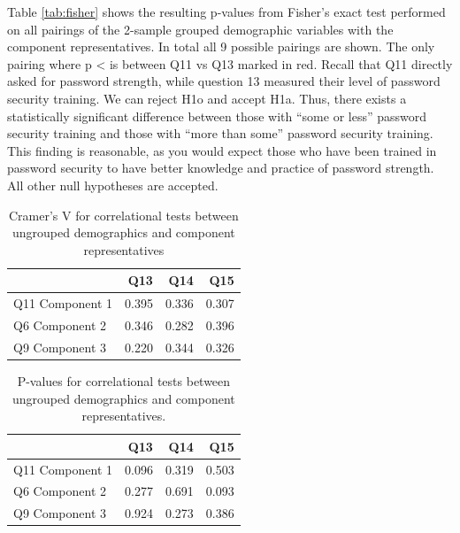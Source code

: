 \documentclass[letterpaper, 10 pt, conference]{ieeeconf}  %
\begin{document}
Table \ref{tab:fisher} shows the resulting p-values from Fisher’s exact test performed on all pairings of the 2-sample grouped demographic variables with the component representatives. In total all 9 possible pairings are shown. The only pairing where p < \textalpha{} is between Q11 vs Q13 marked in red. Recall that Q11 directly asked for password strength, while question 13 measured their level of password security training. We can reject H1o and accept H1a. Thus, there exists a statistically significant difference between those with “some or less” password security training and those with “more than some” password security training. This finding is reasonable, as you would expect those who have been trained in password security to have better knowledge and practice of password strength. All other null hypotheses are accepted.

\begin{table}[h]
\caption{Cramer’s V for correlational tests between ungrouped demographics and component representatives}
\label{tab:cramer}
\begin{center}
\begin{tabular}{lrrr}
\hline
                & Q13   & Q14   & Q15   \\ \hline
Q11 Component 1 & 0.395 & 0.336 & 0.307 \\ \hline
Q6 Component 2  & 0.346 & 0.282 & 0.396 \\ \hline
Q9 Component 3  & 0.220 & 0.344 & 0.326 \\ \hline
\end{tabular}
\end{center}
\end{table}

\begin{table}[h]
\caption{P-values for correlational tests between ungrouped demographics and component representatives.}
\label{tab:cramerp}
\begin{center}
\begin{tabular}{lrrr}
\hline
                & Q13   & Q14   & Q15   \\ \hline
Q11 Component 1 & 0.096 & 0.319 & 0.503 \\ \hline
Q6 Component 2  & 0.277 & 0.691 & 0.093 \\ \hline
Q9 Component 3  & 0.924 & 0.273 & 0.386 \\ \hline
\end{tabular}
\end{center}
\end{table}
\end{document}
